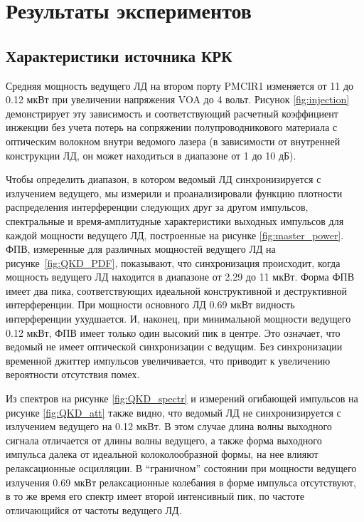 \section{Результаты экспериментов}
\label{sec:results}

\subsection{Характеристики источника КРК}


Средняя мощность ведущего ЛД на втором порту PMCIR1 изменяется от 11 до 0.12 мкВт при увеличении напряжения VOA до 4 вольт. Рисунок \ref{fig:injection} демонстрирует эту зависимость и соответствующий расчетный коэффициент инжекции без учета потерь на сопряжении полупроводникового материала с оптическим волокном внутри ведомого лазера (в зависимости от внутренней конструкции ЛД, он может находиться в диапазоне от 1 до 10 дБ). 

Чтобы определить диапазон, в котором ведомый ЛД синхронизируется с излучением ведущего, мы измерили и проанализировали функцию плотности распределения интерференции следующих друг за другом импульсов, спектральные и время-амплитудные характеристики выходных импульсов для каждой мощности ведущего ЛД, построенные на рисунке \ref{fig:master_power}. ФПВ, измеренные для различных мощностей ведущего ЛД на рисунке~\ref{fig:QKD_PDF}, показывают, что синхронизация происходит, когда мощность ведущего ЛД находится в диапазоне от 2.29 до 11 мкВт. Форма ФПВ имеет два пика, соответствующих идеальной конструктивной и деструктивной интерференции. При мощности основного ЛД 0.69 мкВт видность интерференции ухудшается. И, наконец, при минимальной мощности ведущего 0.12 мкВт, ФПВ имеет только один высокий пик в центре. Это означает, что ведомый не имеет оптической синхронизации с ведущим. Без синхронизации временной джиттер импульсов увеличивается, что приводит к увеличению вероятности отсутствия помех.

Из спектров на рисунке \ref{fig:QKD_spectr} и измерений огибающей импульсов на рисунке \ref{fig:QKD_att} также видно, что ведомый ЛД не синхронизируется с излучением ведущего на 0.12 мкВт. В этом случае длина волны выходного сигнала отличается от длины волны ведущего, а также форма выходного импульса далека от идеальной колоколообразной формы, на нее влияют релаксационные осцилляции. В ``граничном'' состоянии при мощности ведущего излучения 0.69 мкВт релаксационные колебания в форме импульса отсутствуют, в то же время его спектр имеет второй интенсивный пик, по частоте отличающийся от частоты ведущего ЛД.

